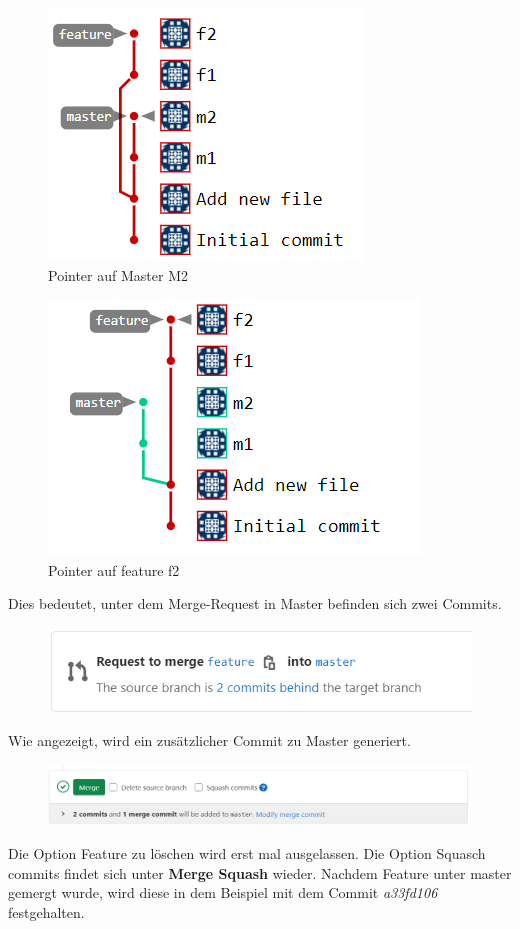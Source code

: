 \begin{figure}[H]
	\centering
	\includegraphics[width=0.7\linewidth]{attachment/chapter_5/Scc017}
	\caption{Pointer auf Master M2}
\end{figure}

\begin{figure}[H]
	\centering
	\includegraphics[width=0.7\linewidth]{attachment/chapter_5/Scc018}
	\caption{Pointer auf feature f2}
\end{figure}

Dies bedeutet, unter dem Merge-Request in Master befinden sich zwei Commits.
\begin{figure}[H]
	\centering
	\includegraphics[width=0.7\linewidth]{attachment/chapter_5/Scc019}
\end{figure}

Wie angezeigt, wird ein zusätzlicher Commit zu Master generiert. 
\begin{figure}[H]
	\centering
	\includegraphics[width=0.7\linewidth]{attachment/chapter_5/Scc020}
\end{figure}
Die Option Feature zu löschen wird erst mal ausgelassen. Die Option Squasch commits findet sich unter \textbf{Merge Squash} wieder. Nachdem Feature unter master gemergt wurde, wird diese in dem Beispiel mit dem Commit \textit{a33fd106} festgehalten.

